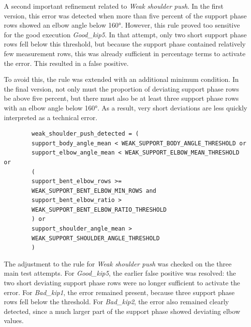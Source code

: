 A second important refinement related to \textit{Weak shoulder push}. In the first version, this error was detected when more than five percent of the support phase rows showed an elbow angle below 160°. However, this rule proved too sensitive for the good execution \textit{Good\_kip5}. In that attempt, only two short support phase rows fell below this threshold, but because the support phase contained relatively few measurement rows, this was already sufficient in percentage terms to activate the error. This resulted in a false positive.

To avoid this, the rule was extended with an additional minimum condition. In the final version, not only must the proportion of deviating support phase rows be above five percent, but there must also be at least three support phase rows with an elbow angle below 160°. As a result, very short deviations are less quickly interpreted as a technical error.

\begin{listing}[H]
    \begin{verbatim}
        weak_shoulder_push_detected = (
        support_body_angle_mean < WEAK_SUPPORT_BODY_ANGLE_THRESHOLD or
        support_elbow_angle_mean < WEAK_SUPPORT_ELBOW_MEAN_THRESHOLD or
        (
        support_bent_elbow_rows >=
        WEAK_SUPPORT_BENT_ELBOW_MIN_ROWS and
        support_bent_elbow_ratio >
        WEAK_SUPPORT_BENT_ELBOW_RATIO_THRESHOLD
        ) or
        support_shoulder_angle_mean >
        WEAK_SUPPORT_SHOULDER_ANGLE_THRESHOLD
        )
    \end{verbatim}
    \caption{Refined detection rule for weak shoulder push in the support phase from \href{https://github.com/Tristanvanspeybroeck/bachelorproef-Methodologie-25-26-Van-Speybroeck-Tristan/blob/main/Methodologie/pose_project/src/analyze_kip_execution.py}{\texttt{analyze\_kip\_execution.py}}}
    \label{lst:weak_shoulder_push_rule}
\end{listing}

The adjustment to the rule for \textit{Weak shoulder push} was checked on the three main test attempts. For \textit{Good\_kip5}, the earlier false positive was resolved: the two short deviating support phase rows were no longer sufficient to activate the error. For \textit{Bad\_kip1}, the error remained present, because three support phase rows fell below the threshold. For \textit{Bad\_kip2}, the error also remained clearly detected, since a much larger part of the support phase showed deviating elbow values.

